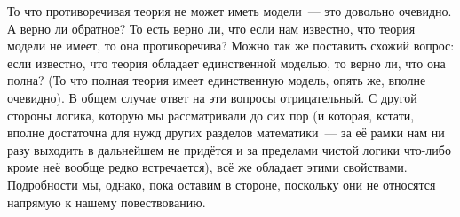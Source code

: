 То что противоречивая теория не может иметь модели~--- это довольно очевидно. А верно ли обратное? То есть верно ли, что если нам известно, что теория модели не имеет, то она противоречива? Можно так же поставить схожий вопрос: если известно, что теория обладает единственной моделью, то верно ли, что она полна? (То что полная теория имеет единственную модель, опять же, вполне очевидно). В общем случае ответ на эти вопросы отрицательный. С другой стороны логика, которую мы рассматривали до сих пор (и которая, кстати, вполне достаточна для нужд других разделов математики~--- за её рамки нам ни разу выходить в дальнейшем не придётся и за пределами чистой логики что-либо кроме неё вообще редко встречается), всё же обладает этими свойствами. Подробности мы, однако, пока оставим в стороне, поскольку они не относятся напрямую к нашему повествованию.
